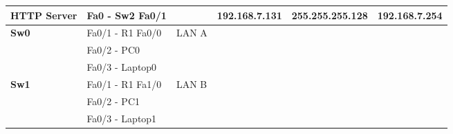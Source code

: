 \documentclass[11pt,a4paper]{report}
\begin{document}
\begin{center}
\begin{longtable}{@{}llllll@{}}
            \textbf{HTTP Server}                               & Fa0 - Sw2 Fa0/1                                          &                                                       & 192.168.7.131                                    & 255.255.255.128                                           & 192.168.7.254                                         \\* \midrule
            \multirow{3}{*}{\textbf{Sw0}}                      & Fa0/1 - R1 Fa0/0                                         & \multirow{3}{*}{LAN A}                                & \multicolumn{3}{c}{\multirow{10}{*}{}}                                                                                                                               \\* \cmidrule(lr){2-2}
                                                               & Fa0/2 - PC0                                              &                                                       & \multicolumn{3}{c}{}                                                                                                                                                 \\* \cmidrule(lr){2-2}
                                                               & Fa0/3 - Laptop0                                          &                                                       & \multicolumn{3}{c}{}                                                                                                                                                 \\* \cmidrule(r){1-3}
            \multirow{3}{*}{\textbf{Sw1}}                      & Fa0/1 - R1 Fa1/0                                         & \multirow{3}{*}{LAN B}                                & \multicolumn{3}{c}{}                                                                                                                                                 \\* \cmidrule(lr){2-2}
                                                               & Fa0/2 - PC1                                              &                                                       & \multicolumn{3}{c}{}                                                                                                                                                 \\* \cmidrule(lr){2-2}
                                                               & Fa0/3 - Laptop1                                          &                                                       & \multicolumn{3}{c}{}                                                                                                                                                 \\* \cmidrule(r){1-3}

\end{longtable}
\end{center}
\end{document}
